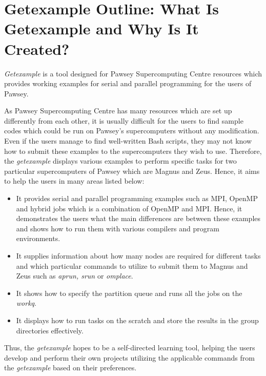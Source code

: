 \section{Getexample Outline: What Is Getexample and Why Is It Created?}

\emph{Getexample} is a tool designed for Pawsey Supercomputing Centre resources which provides working examples for serial and parallel programming for
the users of Pawsey. 

As Pawsey Supercomputing Centre has many resources which are set up differently from each other, it is usually difficult for the users to find sample 
codes which could be run on Pawsey's supercomputers without any modification. Even if the users manage to find well-written Bash scripts, they may not 
know how to submit these examples to the supercomputers they wish to use. Therefore, the \emph{getexample} displays various examples to perform specific 
tasks for two particular supercomputers of Pawsey which are Magnus and Zeus. Hence, it aims to help the users in many areas listed below:

\begin{itemize}
\item It provides serial and parallel programming examples such as MPI, OpenMP and hybrid jobs which is a combination of OpenMP and MPI. Hence, it 
demonstrates the users what the main differences are between these examples and shows how to run them with various compilers and program environments.
\item It supplies information about how many nodes are required for different tasks and which particular commands to utilize to submit them to 
Magnus and Zeus such as \emph{aprun, srun} or \emph{omplace}. 
\item It shows how to specify the partition queue and runs all the jobs on the \emph{workq}.
\item It displays how to run tasks on the scratch and store the results in the group directories effectively.
\end{itemize}   

Thus, the \emph{getexample} hopes to be a self-directed learning tool, helping the users develop and perform their own projects utilizing the applicable
commands from the \emph{getexample} based on their preferences. 
